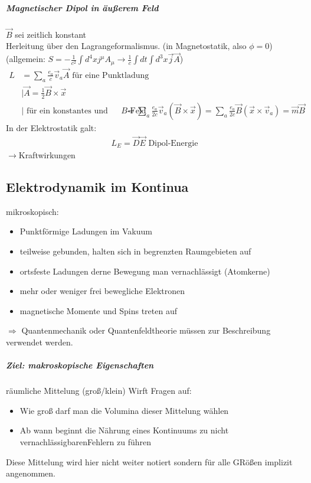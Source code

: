 \documentclass[a4paper]{article}
\begin{document}
\subparagraph{Magnetischer Dipol in äußerem Feld}
$\vec{B}$ sei zeitlich konstant\\
Herleitung über den Lagrangeformalismus. (in Magnetostatik, also $\phi=0$)\\
(allgemein: $ S=-\frac{1}{c^2}\int d^4x j^\mu A_\mu\rightarrow \frac{1}{c}\int
dt \int d^3x \vec{j}\vec{A}$)
\begin{align}
L&=\sum_a\frac{e_a}{c}\vec{v}_a\vec{A} \text{ für eine Punktladung}\\
&|\vec{A}=\frac{1}{2}\vec{B}\times\vec{x} \\&|\text{ für ein konstantes und
 Ortsunabhängiges }B\text{-Feld}
&=\sum_a\frac{e_a}{2c}\vec{v}_a(\vec{B}\times\vec{x})=\sum_a\frac{e_a}{2c}
\vec{B}(\vec{x}\times\vec{v}_a)=\vec{m}\vec{B}
\end{align}
In der Elektrostatik galt:
\begin{align}
L_E=\vec{D}\vec{E} \text{  Dipol-Energie}
\end{align}
$\rightarrow$Kraftwirkungen


\subsection{Elektrodynamik im Kontinua}
mikroskopisch: 
\begin{itemize}
  \item Punktförmige Ladungen im Vakuum
  \item teilweise gebunden, halten sich in  begrenzten Raumgebieten auf
  \item ortsfeste Ladungen derne Bewegung man vernachlässigt (Atomkerne)
  \item mehr oder weniger frei bewegliche Elektronen
  \item magnetische Momente und Spins treten auf
\end{itemize}
$\Rightarrow$ Quantenmechanik oder Quantenfeldtheorie müssen zur Beschreibung
verwendet werden.
\subparagraph{Ziel: makroskopische Eigenschaften}
räumliche Mittelung (groß/klein)
Wirft Fragen auf:
\begin{itemize}
  \item Wie groß darf man die Volumina dieser Mittelung wählen
  \item Ab wann beginnt die Nährung eines Kontinuums zu nicht
  vernachlässigbarenFehlern zu führen
\end{itemize}
Diese Mittelung wird hier nicht weiter notiert sondern für alle GRößen implizit
angenommen.
\end{document}
